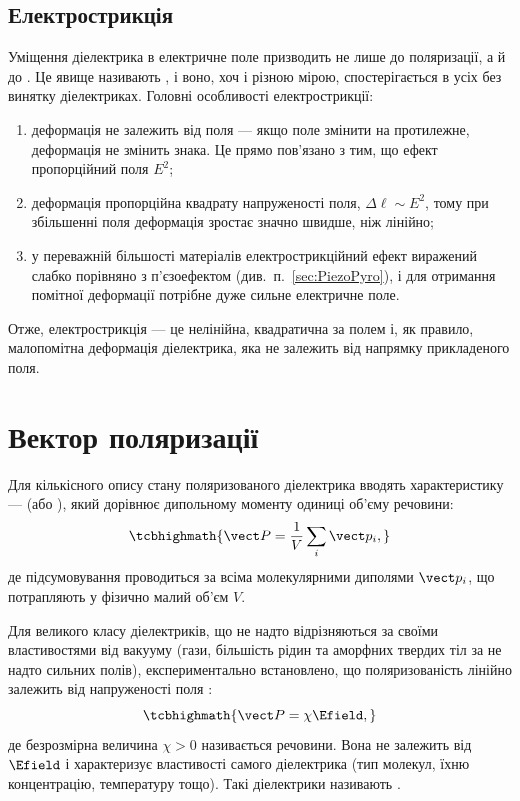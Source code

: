 \subsection*{Електрострикція}

Уміщення діелектрика в електричне поле призводить не лише до поляризації, а й до . Це явище називають
, і воно, хоч і різною мірою, спостерігається в усіх без винятку діелектриках. Головні особливості електрострикції:

\begin{enumerate}
	\item деформація не залежить від  поля --- якщо поле змінити на протилежне, деформація не змінить знака. Це прямо пов'язано з
	      тим, що ефект пропорційний  поля $E^2$;
	\item деформація пропорційна квадрату напруженості поля, $\Delta \ell \sim E^2$, тому при збільшенні поля деформація зростає значно швидше, ніж
	      лінійно;
	\item у переважній більшості матеріалів електрострикційний ефект виражений слабко порівняно з п'єзоефектом (див.~п.~\ref{sec:PiezoPyro}), і для
	      отримання помітної деформації потрібне дуже сильне електричне поле.
\end{enumerate}
Отже, електрострикція --- це нелінійна, квадратична за полем і, як правило, малопомітна деформація діелектрика, яка не залежить від напрямку
прикладеного поля.

\section{Вектор поляризації}

Для кількісного опису стану поляризованого діелектрика вводять  характеристику ---  (або
), який дорівнює дипольному моменту одиниці об'єму речовини:
\begin{equation}\label{eq:Pdef}
	\tcbhighmath{
		\vect P = \frac1V \sum_i \vect p_i,
	}
\end{equation}
де підсумовування проводиться за всіма молекулярними диполями $\vect p_i$, що потрапляють у фізично малий об'єм $V$.

Для великого класу діелектриків, що не надто відрізняються за своїми властивостями від вакууму (гази, більшість рідин та аморфних твердих тіл за не
надто сильних полів), експериментально встановлено, що поляризованість лінійно залежить від напруженості поля :
\begin{equation}\label{eq:PlinearE}
	\tcbhighmath{
		\vect P = \chi \Efield,
	}
\end{equation}
де безрозмірна величина $\chi > 0$ називається  речовини. Вона не залежить від $\Efield$ і характеризує
властивості самого діелектрика (тип молекул, їхню концентрацію, температуру тощо). Такі діелектрики називають .


